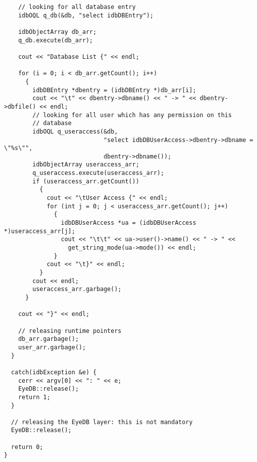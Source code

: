 \begin{verbatim}
    // looking for all database entry
    idbOQL q_db(&db, "select idbDBEntry");

    idbObjectArray db_arr;
    q_db.execute(db_arr);

    cout << "Database List {" << endl;

    for (i = 0; i < db_arr.getCount(); i++)
      {
        idbDBEntry *dbentry = (idbDBEntry *)db_arr[i];
        cout << "\t" << dbentry->dbname() << " -> " << dbentry->dbfile() << endl;
        // looking for all user which has any permission on this
        // database
        idbOQL q_useraccess(&db,
                            "select idbDBUserAccess->dbentry->dbname = \"%s\"",
                            dbentry->dbname());
        idbObjectArray useraccess_arr;
        q_useraccess.execute(useraccess_arr);
        if (useraccess_arr.getCount())
          {
            cout << "\tUser Access {" << endl;
            for (int j = 0; j < useraccess_arr.getCount(); j++)
              {
                idbDBUserAccess *ua = (idbDBUserAccess *)useraccess_arr[j];
                cout << "\t\t" << ua->user()->name() << " -> " <<
                  get_string_mode(ua->mode()) << endl;
              }
            cout << "\t}" << endl;
          }
        cout << endl;
        useraccess_arr.garbage();
      }

    cout << "}" << endl;

    // releasing runtime pointers
    db_arr.garbage();
    user_arr.garbage();
  }

  catch(idbException &e) {
    cerr << argv[0] << ": " << e;
    EyeDB::release();
    return 1;
  }

  // releasing the EyeDB layer: this is not mandatory
  EyeDB::release();

  return 0;
}
\end{verbatim}
\normalsize



